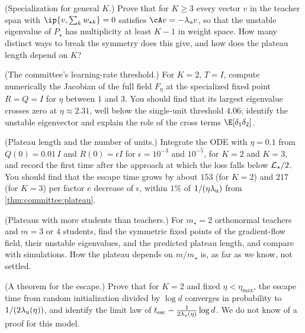 \begin{refsection}
\begin{exercises}
\item \variation (Specialization for general $K$.) Prove that for $K\ge3$ every vector $v$ in the teacher span with $\ip{v,\sum_kw_{\star k}}=0$ satisfies $\cA v=-\committeelu v$, so that the unstable eigenvalue of $P_\star$ has multiplicity at least $K-1$ in weight space. How many distinct ways to break the symmetry does this give, and how does the plateau length depend on $K$?\label{ex:committee:generalK}

\item \simulation (The committee's learning-rate threshold.) For $K=2$, $T=I$, compute numerically the Jacobian of the full field $F_\eta$ at the specialized fixed point $R=Q=I$ for $\eta$ between $1$ and $3$. You should find that its largest eigenvalue crosses zero at $\eta\approx2.31$, well below the single-unit threshold $4.06$; identify the unstable eigenvector and explain the role of the cross terms $\E[\delta_1\delta_2]$.\label{ex:committee:etamax}

\item \simulation (Plateau length and the number of units.) Integrate the ODE with $\eta=0.1$ from $Q(0)=0.01\,I$ and $R(0)=\epsilon I$ for $\epsilon=10^{-3}$ and $10^{-5}$, for $K=2$ and $K=3$, and record the first time after the approach at which the loss falls below $\mathcal{L}_\star/2$. You should find that the escape time grows by about $153$ (for $K=2$) and $217$ (for $K=3$) per factor $e$ decrease of $\epsilon$, within $1\%$ of $1/(\eta\lambda_{\mathrm u})$ from \cref{thm:committee:plateau}.\label{ex:committee:Kscaling}

\item \research (Plateaus with more students than teachers.) For $m_\star=2$ orthonormal teachers and $m=3$ or $4$ students, find the symmetric fixed points of the gradient-flow field, their unstable eigenvalues, and the predicted plateau length, and compare with simulations. How the plateau depends on $m/m_\star$ is, as far as we know, not settled.\label{ex:committee:over}

\item \research (A theorem for the escape.) Prove that for $K=2$ and fixed $\eta<\eta_{\max}$, the escape time from random initialization divided by $\log d$ converges in probability to $1/(2\lambda_{\mathrm u}(\eta))$, and identify the limit law of $t_{\mathrm{esc}}-\frac1{2\lambda_{\mathrm u}(\eta)}\log d$. We do not know of a proof for this model.\label{ex:committee:escapethm}
\end{exercises}


\end{refsection}
